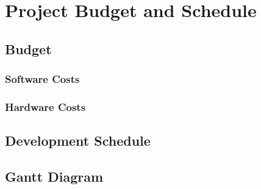 \chapter{Project Budget and Schedule}
    \section{Budget}
        \subsection{Software Costs}
        \subsection{Hardware Costs}
    \section{Development Schedule}
        \section{Gantt Diagram}
